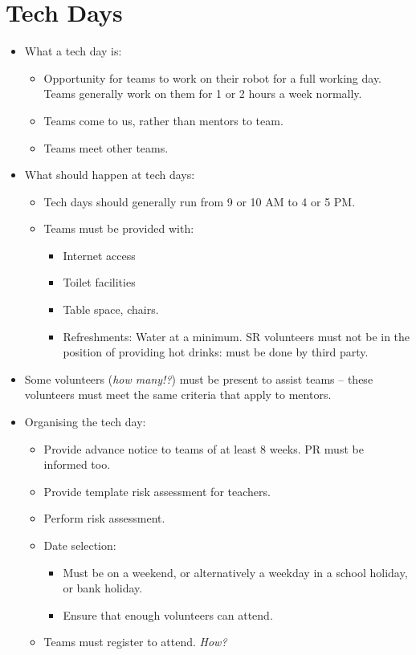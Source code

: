 \section{Tech Days}

\begin{itemize}
\item What a tech day is:
  \begin{itemize}
  \item Opportunity for teams to work on their robot for a full working day.  Teams generally work on them for 1 or 2 hours a week normally.
  \item Teams come to us, rather than mentors to team.
  \item Teams meet other teams.
  \end{itemize}


\item What should happen at tech days:
  \begin{itemize}
  \item Tech days should generally run from 9 or 10 AM to 4 or 5 PM.
  \item Teams must be provided with:
    \begin{itemize}
    \item Internet access
    \item Toilet facilities
    \item Table space, chairs.
    \item Refreshments: Water at a minimum.  SR volunteers must not be in the position of providing hot drinks: must be done by third party.
    \end{itemize}
  \end{itemize}

\item Some volunteers (\textit{how many!?}) must be present to assist teams -- these volunteers must meet the same criteria that apply to mentors.

\item  Organising the tech day:
  \begin{itemize}
  \item Provide advance notice to teams of at least 8 weeks.  PR must be informed too.
  \item Provide template risk assessment for teachers.
  \item Perform risk assessment.
  \item Date selection:
    \begin{itemize}
    \item Must be on a weekend, or alternatively a weekday in a school holiday, or bank holiday.
    \item Ensure that enough volunteers can attend.
    \end{itemize}
  \item Teams must register to attend.  \textit{How?}
  \end{itemize}

\end{itemize}
